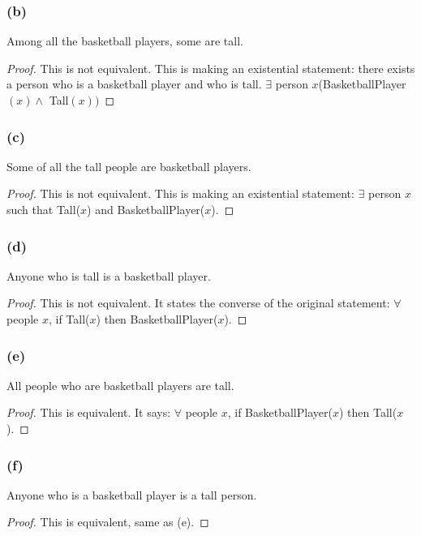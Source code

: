 \documentclass[14pt]{extarticle}
\newcommand{\fa}{\forall}
\newcommand{\te}{\exists}
\begin{document}
\subsubsection{(b)}
Among all the basketball players, some are tall.

\begin{proof}
    This is not equivalent. This is making an existential statement: there exists a person who is a basketball player and who is tall. $\te$ person $x$(BasketballPlayer$(x) \wedge$ Tall$(x))$
\end{proof}

\subsubsection{(c)}
Some of all the tall people are basketball players.

\begin{proof}
    This is not equivalent. This is making an existential statement: $\te$ person $x$ such that Tall($x$) and BasketballPlayer($x$).
\end{proof}

\subsubsection{(d)}
Anyone who is tall is a basketball player.

\begin{proof}
    This is not equivalent. It states the converse of the original statement: $\fa$ people $x$, if Tall($x$) then BasketballPlayer($x$).
\end{proof}

\subsubsection{(e)}
All people who are basketball players are tall.

\begin{proof}
    This is equivalent. It says: $\fa$ people $x$, if BasketballPlayer($x$) then Tall($x$).
\end{proof}

\subsubsection{(f)}
Anyone who is a basketball player is a tall person.

\begin{proof}
    This is equivalent, same as (e).
\end{proof}
\end{document}
